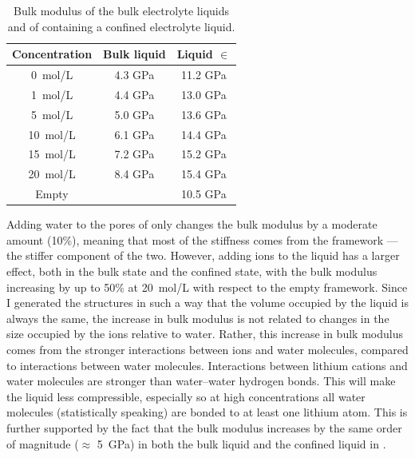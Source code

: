 \documentclass[thesis]{subfiles}
\begin{document}
\begin{table}[ht]
    \caption{Bulk modulus of the bulk electrolyte liquids and of 
    containing a confined electrolyte liquid.}
    \label{table:bulk}
    \centering
    \renewcommand{\arraystretch}{1.1}
    \begin{tabular}{c c c}
        \toprule
        Concentration   & Bulk liquid  & Liquid $\in$ \ZIF8 \\
        \midrule
        \SI{0}{mol/L}   &    4.3 GPa   &  11.2 GPa    \\
        \SI{1}{mol/L}   &    4.4 GPa   &  13.0 GPa    \\
        \SI{5}{mol/L}   &    5.0 GPa   &  13.6 GPa    \\
        \SI{10}{mol/L}  &    6.1 GPa   &  14.4 GPa    \\
        \SI{15}{mol/L}  &    7.2 GPa   &  15.2 GPa    \\
        \SI{20}{mol/L}  &    8.4 GPa   &  15.4 GPa    \\
        \bottomrule
        Empty \ZIF8     &              &  10.5 GPa     \\
        \bottomrule
    \end{tabular}
\end{table}

Adding water to the pores of  only changes the bulk modulus by a moderate
amount (10\%), meaning that most of the stiffness comes from the  framework
--- the stiffer component of the two. However, adding ions to the liquid has a
larger effect, both in the bulk state and the confined state, with the bulk
modulus increasing by up to 50\% at \SI{20}{mol/L} with respect to the empty
framework. Since I generated the structures in such a way that the volume
occupied by the liquid is always the same, the increase in bulk modulus is not
related to changes in the size occupied by the ions relative to water. Rather,
this increase in bulk modulus comes from the stronger interactions between ions
and water molecules, compared to interactions between water molecules.
Interactions between lithium cations and water molecules are stronger than
water--water hydrogen bonds. This will make the liquid less compressible,
especially so at high concentrations all water molecules (statistically
speaking) are bonded to at least one lithium atom. This is further supported by
the fact that the bulk modulus increases by the same order of magnitude
($\approx$ \SI{5}{GPa}) in both the bulk liquid and the confined liquid in
.

\newpage
\end{document}
